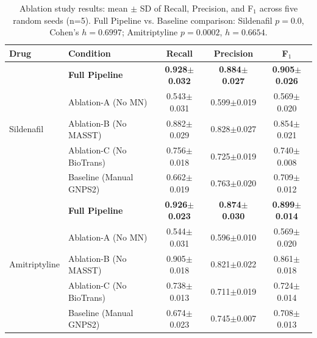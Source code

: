 \begin{table}[htbp]
\centering
\caption{Ablation study results: mean $\pm$ SD of Recall, Precision, and F$_1$ across five random seeds (n=5). Full Pipeline vs. Baseline comparison: Sildenafil $p=0.0$, Cohen's $h=0.6997$; Amitriptyline $p=0.0002$, $h=0.6654$.}
\label{tab:ablation}
\begin{tabular}{llccc}
\toprule
Drug & Condition & Recall & Precision & F$_1$ \\
\midrule
\multirow{5}{*}{Sildenafil} & \textbf{Full Pipeline} & \textbf{0.928$\pm$0.032} & \textbf{0.884$\pm$0.027} & \textbf{0.905$\pm$0.026} \\
 & Ablation-A (No MN) & 0.543$\pm$0.031 & 0.599$\pm$0.019 & 0.569$\pm$0.020 \\
 & Ablation-B (No MASST) & 0.882$\pm$0.029 & 0.828$\pm$0.027 & 0.854$\pm$0.021 \\
 & Ablation-C (No BioTrans) & 0.756$\pm$0.018 & 0.725$\pm$0.019 & 0.740$\pm$0.008 \\
 & Baseline (Manual GNPS2) & 0.662$\pm$0.019 & 0.763$\pm$0.020 & 0.709$\pm$0.012 \\
\midrule
\multirow{5}{*}{Amitriptyline} & \textbf{Full Pipeline} & \textbf{0.926$\pm$0.023} & \textbf{0.874$\pm$0.030} & \textbf{0.899$\pm$0.014} \\
 & Ablation-A (No MN) & 0.544$\pm$0.031 & 0.596$\pm$0.010 & 0.569$\pm$0.020 \\
 & Ablation-B (No MASST) & 0.905$\pm$0.018 & 0.821$\pm$0.022 & 0.861$\pm$0.018 \\
 & Ablation-C (No BioTrans) & 0.738$\pm$0.013 & 0.711$\pm$0.019 & 0.724$\pm$0.014 \\
 & Baseline (Manual GNPS2) & 0.674$\pm$0.023 & 0.745$\pm$0.007 & 0.708$\pm$0.013 \\
\midrule
\bottomrule
\end{tabular}
\end{table}